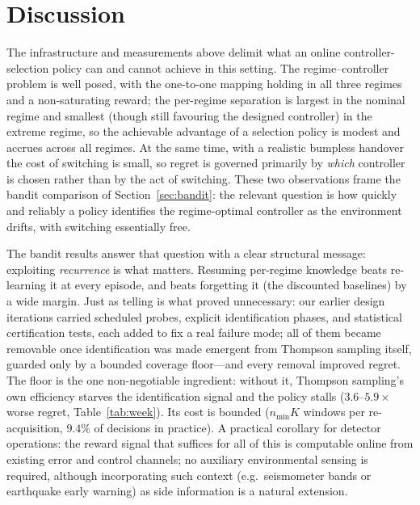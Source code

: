 \documentclass[11pt,a4paper]{article}
\begin{document}
\section{Discussion}\label{sec:discussion}
The infrastructure and measurements above delimit what an online controller-
selection policy can and cannot achieve in this setting. The regime--controller
problem is well posed, with the one-to-one mapping holding in all three regimes
and a non-saturating reward; the per-regime separation is largest in the nominal
regime and smallest (though still favouring the designed controller) in the
extreme regime, so the achievable advantage of a selection policy is modest and
accrues across all regimes. At the same time, with a realistic bumpless handover the cost of
switching is small, so regret is governed primarily by \emph{which} controller is
chosen rather than by the act of switching. These two observations frame the
bandit comparison of Section~\ref{sec:bandit}: the relevant question is how
quickly and reliably a policy identifies the regime-optimal controller as the
environment drifts, with switching essentially free.

The bandit results answer that question with a clear structural message:
exploiting \emph{recurrence} is what matters. Resuming per-regime knowledge
beats re-learning it at every episode, and beats forgetting it (the discounted
baselines) by a wide margin. Just as telling is what proved unnecessary: our
earlier design iterations carried scheduled probes, explicit identification
phases, and statistical certification tests, each added to fix a real failure
mode; all of them became removable once identification was made emergent from
Thompson sampling itself, guarded only by a bounded coverage floor---and every
removal improved regret. The floor is the one non-negotiable ingredient:
without it, Thompson sampling's own efficiency starves the identification
signal and the policy stalls ($3.6$--$5.9\times$ worse regret,
Table~\ref{tab:week}). Its cost is bounded ($n_{\min}K$ windows per
re-acquisition, $9.4\%$ of decisions in practice). A practical corollary for
detector operations: the reward signal that suffices for all of this is
computable online from existing error and control channels; no auxiliary
environmental sensing is required, although incorporating such context (e.g.\
seismometer bands or earthquake early warning) as side information is a
natural extension.
\end{document}

